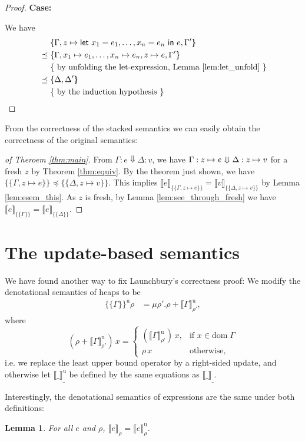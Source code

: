 \documentclass{scrartcl}
\newtheorem{lemma}{Lemma}
\theoremstyle{nonumberbreak}
\newtheorem{proof}{Proof}
\newcommand{\sLet}[2]{\text{\textsf{let}}\ #1\ \text{\textsf{in}}\ #2}
\newcommand{\sred}[4]{#1 : #2 \Downarrow #3 : #4}
\newcommand{\ssred}[4]{#1 : #2 \mathrel{\rotatebox[origin=c]{90}{$\Lleftarrow$}} #3 : #4}
\newcommand{\sRule}[1]{\text{{\textsc{#1}}}}
\newcommand{\dom}[1]{\text{dom}\;#1}
\newcommand{\xeng}{x_1 = e_1, \ldots, x_n = e_n}
\newcommand{\xen}{x_1\mapsto e_1, \ldots, x_n\mapsto e_n}
\newcommand{\dsem}[2]{\llbracket #1 \rrbracket_{#2}}
\newcommand{\esem}[1]{\{\!\!\!\{#1\}\!\!\!\}}
\newcommand{\dsemu}[2]{\llbracket #1 \rrbracket^{\text{u}}_{#2}}
\newcommand{\esemu}[1]{\{\!\!\!\{#1\}\!\!\!\}^{\text{u}}}
\newcommand{\case}[1]{\par\smallskip\noindent\textbf{Case:} #1\nopagebreak\par\noindent\ignorespaces}
\newcommand{\beginright}{&\mathrel{\phantom{=}}}
\newcommand{\aexpl}[1]{&\mathrel{\phantom{=}}\left\{\text{ #1 }\right\}}
\begin{document}
\begin{proof}
\case{\sRule{Let}}
We have
\begin{align*}
\beginright
\esem{\Gamma,z \mapsto \sLet{\xeng}e, \Gamma'}\\
&\preceq \esem{\Gamma,\xen, z \mapsto e, \Gamma'} \\
\aexpl{by unfolding the let-expression, Lemma \ref{lem:let_unfold}} \\
&\preceq \esem{\Delta,\Delta'}\\
\aexpl{by the induction hypothesis}
\end{align*}
\end{proof}

From the correctness of the stacked semantics we can easily obtain the correctness of the original semantics:

\begin{proof}[of Theroem \ref{thm:main}]
From $\sred \Gamma e \Delta v$, we have $\ssred{\Gamma}{z \mapsto e}{\Delta}{z\mapsto v}$ for a fresh $z$ by Theorem \ref{thm:equiv}. By the theorem just shown, we have $\esem{\Gamma, z \mapsto e} \preceq \esem{\Delta, z\mapsto v}$. This implies $\dsem{e}{\esem{\Gamma, z \mapsto e}} = \dsem{v}{\esem{\Delta, z\mapsto v}}$ by Lemma \ref{lem:esem_this}. As $z$ is fresh, by Lemma \ref{lem:see_through_fresh} we have $\dsem{e}{\esem{\Gamma}} = \dsem{e}{\esem{\Delta}}$.
\end{proof}

\section{The update-based semantics}
\label{updsemantics}

We have found another way to fix Launchbury's correctness proof: We modify the denotational semantics of heaps to be
\begin{align*}
\esemu{ \Gamma }\rho &= \mu \rho'. \rho + \dsemu{\Gamma}{\rho'},
\end{align*}
where
\[
(\rho + \dsemu{\Gamma}{\rho'})\, x = 
\begin{cases}
(\dsemu{\Gamma}{\rho'})\, x, &\text{if } x \in \dom \Gamma\\
\rho\, x &\text{otherwise},
\end{cases}
\]
i.e. we replace the least upper bound operator by a right-sided update, and otherwise let $\dsemu{\_}\_$ be defined by the same equations as $\dsem{\_}\_$.

Interestingly, the denotational semantics of expressions are the same under both definitions:
\begin{lemma}
For all $e$ and $\rho$, $\dsem{e}{\rho} = \dsemu{e}{\rho}$.
\label{lem:deneq}
\end{lemma}
\end{document}
